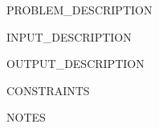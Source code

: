 \documentclass{icpcproblem}
\begin{document}
\makeproblemhead

\begin{ProblemDescription}
{{PROBLEM_DESCRIPTION}}
\end{ProblemDescription}

\begin{Input}
{{INPUT_DESCRIPTION}}
\end{Input}

\begin{Output}
{{OUTPUT_DESCRIPTION}}
\end{Output}

\begin{Constraints}
\begin{itemize}
{{CONSTRAINTS}}
\end{itemize}
\end{Constraints}

\begin{Sample}
\end{Sample}

\begin{Notes}
{{NOTES}}
\end{Notes}
\end{document}
